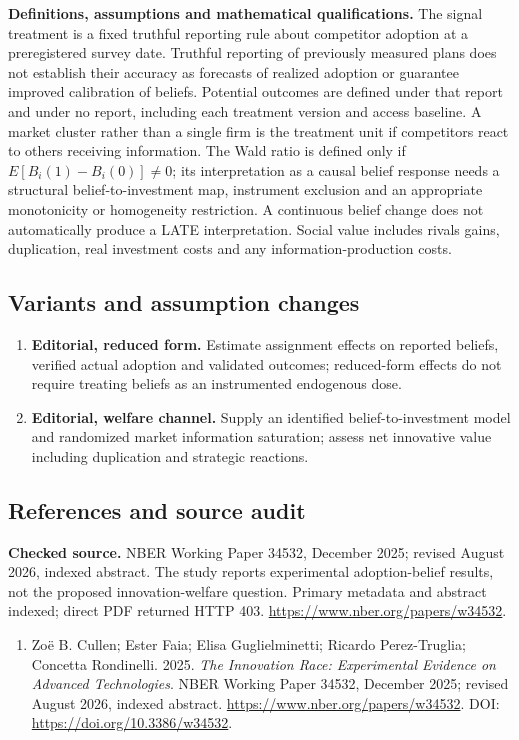 \documentclass[11pt,a4paper]{article}
\begin{document}
\textbf{Definitions, assumptions and mathematical qualifications.} The signal treatment is a fixed truthful reporting rule about competitor adoption at a preregistered survey date. Truthful reporting of previously measured plans does not establish their accuracy as forecasts of realized adoption or guarantee improved calibration of beliefs. Potential outcomes are defined under that report and under no report, including each treatment version and access baseline. A market cluster rather than a single firm is the treatment unit if competitors react to others receiving information. The Wald ratio is defined only if \(E[B_i(1)-B_i(0)]\ne0\); its interpretation as a causal belief response needs a structural belief-to-investment map, instrument exclusion and an appropriate monotonicity or homogeneity restriction. A continuous belief change does not automatically produce a LATE interpretation. Social value includes rivals gains, duplication, real investment costs and any information-production costs.
\subsection*{Variants and assumption changes}
\begin{enumerate}
\item \textbf{Editorial, reduced form.} Estimate assignment effects on reported beliefs, verified actual adoption and validated outcomes; reduced-form effects do not require treating beliefs as an instrumented endogenous dose.
\item \textbf{Editorial, welfare channel.} Supply an identified belief-to-investment model and randomized market information saturation; assess net innovative value including duplication and strategic reactions.
\end{enumerate}
\subsection*{References and source audit}
\textbf{Checked source.} NBER Working Paper 34532, December 2025; revised August 2026, indexed abstract. The study reports experimental adoption-belief results, not the proposed innovation-welfare question. Primary metadata and abstract indexed; direct PDF returned HTTP 403. \url{https://www.nber.org/papers/w34532}.
\begin{enumerate}\raggedright
\item\hypertarget{definitions:source:30007695:1}{} Zoë B. Cullen; Ester Faia; Elisa Guglielminetti; Ricardo Perez-Truglia; Concetta Rondinelli. 2025. \emph{The Innovation Race: Experimental Evidence on Advanced Technologies}. NBER Working Paper 34532, December 2025; revised August 2026, indexed abstract.
\url{https://www.nber.org/papers/w34532}.
DOI: \url{https://doi.org/10.3386/w34532}.
\end{enumerate}
\end{document}
